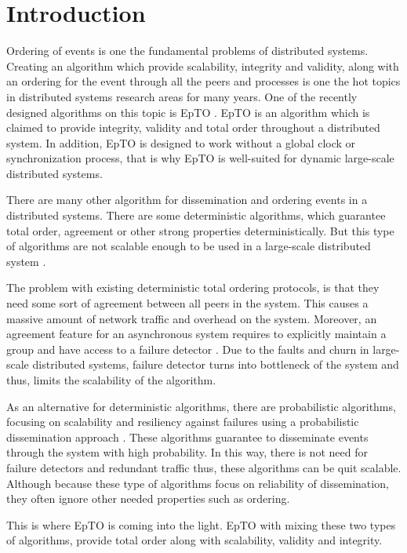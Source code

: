\documentclass[10pt,conference,a4paper]{IEEEtran}
\title{\mytitle}
\author{\IEEEauthorblockN{\jocelyn\IEEEauthorrefmark{1},
\ehsan\IEEEauthorrefmark{2}}
\IEEEauthorblockA{Université de Neuchâtel\\
Neuchâtel, Switzerland\\
Email: \IEEEauthorrefmark{1}\href{mailto:jocelyn.thode@unifr.ch}{jocelyn.thode@unifr.ch},
\IEEEauthorrefmark{2}\href{mailto:ehsan.farhadi@unine.ch}{ehsan.farhadi@unine.ch}}}
\begin{document}
\graphicspath{{figures/}}


\maketitle


\begin{abstract}

\end{abstract}
\section{Introduction}
Ordering of events is one the fundamental problems of distributed systems. Creating an algorithm which provide scalability, integrity and validity, along with an ordering for the event through all the peers and processes is one the hot topics in distributed systems research areas for many years. One of the recently designed algorithms on this topic is EpTO \autocite{matos2015epto}. EpTO is an algorithm which is claimed to provide integrity, validity and total order throughout a distributed system. In addition, EpTO is designed to work without a global clock or synchronization process, that is why EpTO is well-suited for dynamic large-scale distributed systems.
\par 
There are many other algorithm for dissemination and ordering events in a distributed systems. There are some deterministic algorithms, which guarantee total order, agreement or other strong properties deterministically. But this type of algorithms are not scalable enough to be used in a large-scale distributed system \autocites[]{defago2004total}[]{lamport1978time}.
\par
The problem with existing deterministic total ordering protocols, is that they need some sort of agreement between all peers in the system. This causes a massive amount of network traffic and overhead on the system.
Moreover, an agreement feature for an asynchronous system requires to
explicitly maintain a group and have access to a failure detector \autocites[]{chandra1996weakest}[]{chandra1996unreliable}. Due to the faults and churn in large-scale distributed systems, failure detector turns into bottleneck of the system and thus, limits the scalability of the algorithm.
\par
As an alternative for deterministic algorithms, there are probabilistic algorithms, focusing on scalability and resiliency against failures using a probabilistic dissemination approach \autocites []{birman1999bimodal}[]{carvalho2007emergent}[]{demers1987epidemic}[]{eugster2003lightweight}[]{felber2002probabilistic}[]{hayden1996probabilistic}[]{kim2004gossip}[]{Koldehofe02simplegossiping}. These algorithms guarantee to disseminate events through the system with high probability. In this way, there is not need for failure detectors and redundant traffic thus, these algorithms can be quit scalable. Although because these type of algorithms focus on reliability of dissemination, they often ignore other needed properties such as ordering.
\par
This is where EpTO is coming into the light. EpTO with mixing these two types of algorithms, provide total order along with scalability, validity and integrity. 
\end{document}

